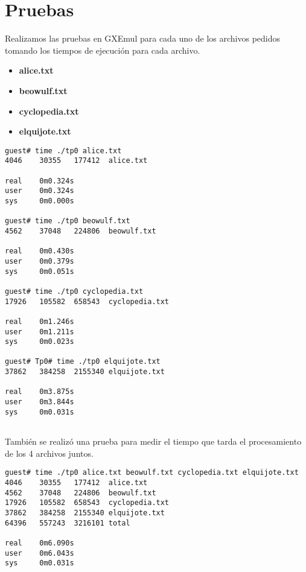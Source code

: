 \documentclass[a4paper]{article}
\begin{document}
\section{Pruebas}
Realizamos las pruebas en GXEmul para cada uno de los archivos pedidos tomando los tiempos de ejecución para cada archivo.
\begin{itemize}
\item \textbf{alice.txt}
\item \textbf{beowulf.txt}
\item \textbf{cyclopedia.txt}
\item \textbf{elquijote.txt}

\end{itemize}


\begin{verbatim}
guest# time ./tp0 alice.txt
4046    30355   177412  alice.txt

real    0m0.324s
user    0m0.324s
sys     0m0.000s

guest# time ./tp0 beowulf.txt
4562    37048   224806  beowulf.txt

real    0m0.430s
user    0m0.379s
sys     0m0.051s

guest# time ./tp0 cyclopedia.txt
17926   105582  658543  cyclopedia.txt

real    0m1.246s
user    0m1.211s
sys     0m0.023s

guest# Tp0# time ./tp0 elquijote.txt
37862   384258  2155340 elquijote.txt

real    0m3.875s
user    0m3.844s
sys     0m0.031s


\end{verbatim}

También se realizó una prueba para medir el tiempo que tarda el procesamiento de los 4 archivos juntos.
\begin{verbatim}
guest# time ./tp0 alice.txt beowulf.txt cyclopedia.txt elquijote.txt
4046    30355   177412  alice.txt
4562    37048   224806  beowulf.txt
17926   105582  658543  cyclopedia.txt
37862   384258  2155340 elquijote.txt
64396   557243  3216101 total

real    0m6.090s
user    0m6.043s
sys     0m0.031s
\end{verbatim}
\end{document}
